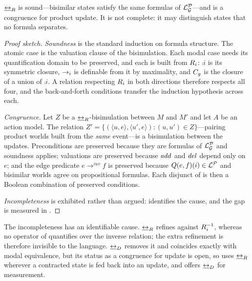 \documentclass[11pt,a4paper]{article}
\begin{document}
\begin{proposition}
\label{prop:bisim}
$\mathbin{\underline{\leftrightarrow}_{R}}$ is sound---bisimilar states satisfy the same formulas of $\mathcal{L}^{\mathcal{P}}_{\mathcal{G}}$---and is a
congruence for product update. It is not complete: it may distinguish states that no formula
separates.
\end{proposition}

\begin{proof}[Proof sketch]
\emph{Soundness} is the standard induction on formula structure. The atomic case is the
valuation clause of the bisimulation. Each modal case needs its quantification domain to be
preserved, and each is built from $R_{i}$: $\comp{i}$ is its symmetric closure,
$\rightarrow_{i}$ is definable from it by maximality, and $C_{g}$ is the closure of a union of
$\comp{i}$. A relation respecting $R_{i}$ in both directions therefore respects all
four, and the back-and-forth conditions transfer the induction hypothesis across each.

\emph{Congruence.} Let $Z$ be a $\mathbin{\underline{\leftrightarrow}_{R}}$-bisimulation between $M$ and $M'$ and let $A$ be
an action model. The relation $Z' = \{(\langle u,e\rangle, \langle u',e\rangle) : (u,u') \in
Z\}$---pairing product worlds built from the \emph{same} event---is a bisimulation between
the updates. Preconditions are preserved because they are formulas of $\mathcal{L}^{\mathcal{P}}_{\mathcal{G}}$ and soundness
applies; valuations are preserved because $\mathit{add}$ and $\mathit{del}$ depend only on $e$; and the edge
predicate $e \longrightarrow^{iuv} f$ is preserved because $Q(e,f)(i) \in \mathcal{L}^{\mathcal{P}}$ and
bisimilar worlds agree on propositional formulas. Each disjunct of  is then
a Boolean combination of preserved conditions.

\emph{Incompleteness} is exhibited rather than argued:  identifies the
cause, and the gap is measured in .
\end{proof}

The incompleteness has an identifiable cause. $\mathbin{\underline{\leftrightarrow}_{R}}$ refines against $R_{i}^{-1}$,
whereas no operator of  quantifies over the inverse relation; the extra
refinement is therefore invisible to the language. $\mathbin{\underline{\leftrightarrow}_{D}}$ removes it and coincides exactly
with modal equivalence, but its status as a congruence for update is open, so \delhi{} uses
$\mathbin{\underline{\leftrightarrow}_{R}}$ wherever a contracted state is fed back into an update, and offers $\mathbin{\underline{\leftrightarrow}_{D}}$ for
measurement.
\end{document}
